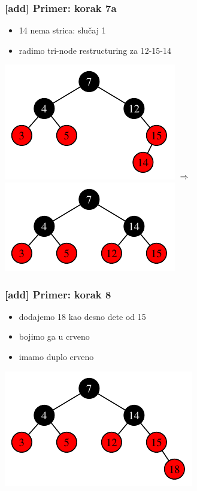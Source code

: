 \documentclass[compress,aspectratio=169]{beamer}
\begin{document}
\begin{frame}[fragile]
  \frametitle{[add] Primer: korak 7a}
  \begin{itemize}
    \item 14 nema strica: slučaj 1
    \item radimo tri-node restructuring za 12-15-14
  \end{itemize}
  \begin{center}
    \includegraphics[scale=1.0]{asp-11-add-09.pdf} $\Rightarrow$
    \includegraphics[scale=1.0]{asp-11-add-10.pdf}
  \end{center}
\end{frame}

\begin{frame}[fragile]
  \frametitle{[add] Primer: korak 8}
  \begin{itemize}
    \item dodajemo 18 kao desno dete od 15
    \item bojimo ga u crveno
    \item imamo duplo crveno
  \end{itemize}
  \begin{center}
    \includegraphics[scale=0.8]{asp-11-add-11.pdf}
  \end{center}
\end{frame}
\end{document}

